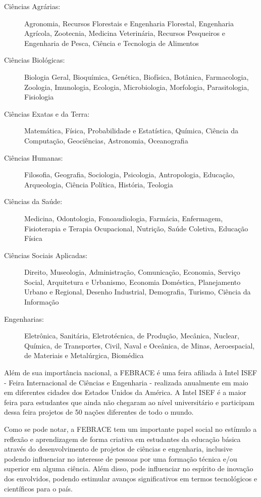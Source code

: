 \begin{description}
    \item[Ciências Agrárias:] 
        Agronomia, Recursos Florestais e Engenharia Florestal, Engenharia Agrícola, Zootecnia, Medicina Veterinária, Recursos Pesqueiros e Engenharia de Pesca, Ciência e Tecnologia de Alimentos
    \item[Ciências Biológicas:] 
        Biologia Geral, Bioquímica, Genética, Biofísica, Botânica, Farmacologia, Zoologia, Imunologia, Ecologia, Microbiologia, Morfologia, Parasitologia, Fisiologia 	 
    \item[Ciências Exatas e da Terra:] 
        Matemática, Física, Probabilidade e Estatística, Química, Ciência da Computação, Geociências, Astronomia, Oceanografia 
    \item[Ciências Humanas:] 
        Filosofia, Geografia, Sociologia, Psicologia, Antropologia, Educação, Arqueologia, Ciência Política, História, Teologia 
    \item[Ciências da Saúde:] 
        Medicina, Odontologia, Fonoaudiologia, Farmácia, Enfermagem, Fisioterapia e Terapia Ocupacional, Nutrição, Saúde Coletiva, Educação Física
    \item[Ciências Sociais Aplicadas:] 
        Direito, Museologia, Administração, Comunicação, Economia, Serviço Social, Arquitetura e Urbanismo, Economia Doméstica, Planejamento Urbano e Regional, Desenho Industrial, Demografia, Turismo, Ciência da Informação  	 
    \item[Engenharias:] 
        Eletrônica, Sanitária, Eletrotécnica, de Produção, Mecânica, Nuclear, Química, de Transportes, Civil, Naval e Oceânica, de Minas, Aeroespacial, de Materiais e Metalúrgica, Biomédica 
\end{description}

Além de sua importância nacional, a FEBRACE é uma feira afiliada à Intel ISEF - Feira Internacional de Ciências e Engenharia - realizada anualmente em maio em diferentes cidades dos Estados Unidos da América. A Intel ISEF é a maior feira para estudantes que ainda não chegaram ao nível universitário e participam dessa feira projetos de 50 nações diferentes de todo o mundo.

Como se pode notar, a FEBRACE tem um importante papel social no estímulo a reflexão e aprendizagem de forma criativa em estudantes da educação básica através do desenvolvimento de projetos de ciências e engenharia, inclusive podendo influenciar no interesse de pessoas por uma formação técnica e/ou superior em alguma ciência. Além disso, pode influenciar no espírito de inovação dos envolvidos, podendo estimular avanços significativos em termos tecnológicos e científicos para o país.

